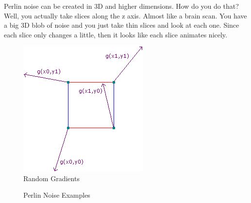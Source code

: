 Perlin noise can be created in 3D and higher dimensions. How do you do that? Well, you actually take slices along the z axis. Almost like a brain scan. You have a big 3D blob of noise and you just take thin slices and look at each one. Since each slice only changes a little, then it looks like each slice animates nicely.

\begin{figure}
	\center
	\includegraphics[scale=0.5]{images/gradients.png}
	\caption{Random Gradients}
	\label{fig:randomGradients}
\end{figure}
\begin{figure}
	\center
	\caption{Perlin Noise Examples}
	\label{fig:perlinEg}
\end{figure}

